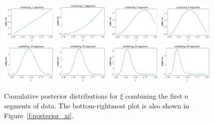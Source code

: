 \begin{figure}[htbp!]
\begin{center}
\includegraphics[width=0.24\textwidth]{Figures/posterior_xi_cum_0}
\includegraphics[width=0.24\textwidth]{Figures/posterior_xi_cum_1}
\includegraphics[width=0.24\textwidth]{Figures/posterior_xi_cum_2}
\includegraphics[width=0.24\textwidth]{Figures/posterior_xi_cum_3}
\includegraphics[width=0.24\textwidth]{Figures/posterior_xi_cum_9}
\includegraphics[width=0.24\textwidth]{Figures/posterior_xi_cum_19}
\includegraphics[width=0.24\textwidth]{Figures/posterior_xi_cum_29}
\includegraphics[width=0.24\textwidth]{Figures/posterior_xi_cum_39}
\caption{Cumulative posterior distributions for $\xi$ combining the
first $n$ segments of data.
The bottom-rightmost plot is also shown in Figure~\ref{f:posterior_xi}.}
\label{f:posteriors_xi_cum}
\end{center}
\end{figure}


